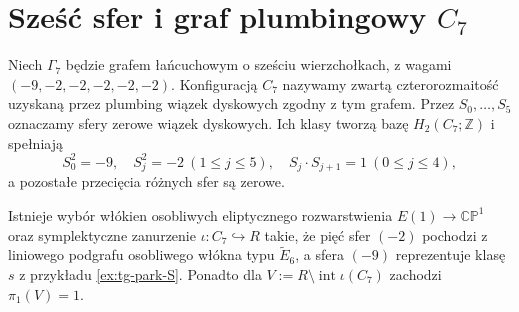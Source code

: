 \section{Sześć sfer i graf plumbingowy \texorpdfstring{$C_7$}{C7}}
\label{sec:tg-park-c7}

\begin{definicja}[Konfiguracja $C_7$]
Niech $\Gamma_7$ będzie grafem łańcuchowym o sześciu
wierzchołkach, z wagami $(-9,-2,-2,-2,-2,-2)$.
Konfiguracją $C_7$ nazywamy zwartą czterorozmaitość
uzyskaną przez plumbing wiązek dyskowych zgodny z tym grafem.
Przez $S_0,\ldots,S_5$ oznaczamy sfery zerowe wiązek
dyskowych. Ich klasy tworzą bazę $H_2(C_7;\mathbb Z)$
i spełniają
\[
S_0^2=-9,\quad S_j^2=-2\ (1\le j\le5),\quad
S_j\cdot S_{j+1}=1\ (0\le j\le4),
\]
a pozostałe przecięcia różnych sfer są zerowe.
\end{definicja}

\begin{center}
\end{center}

\begin{twierdzenie}
\label{thm:tg-park-embedding}
Istnieje wybór włókien osobliwych eliptycznego rozwarstwienia
$E(1)\to\mathbb{CP}^{1}$ oraz symplektyczne zanurzenie
$\iota\colon C_7\hookrightarrow R$ takie, że pięć sfer
$(-2)$ pochodzi z liniowego podgrafu osobliwego włókna
typu $\widetilde E_6$, a sfera $(-9)$ reprezentuje klasę
$s$ z przykładu \ref{ex:tg-park-S}. Ponadto dla
$V:=R\setminus\operatorname{int}\iota(C_7)$ zachodzi
$\pi_1(V)=1$.
\end{twierdzenie}

